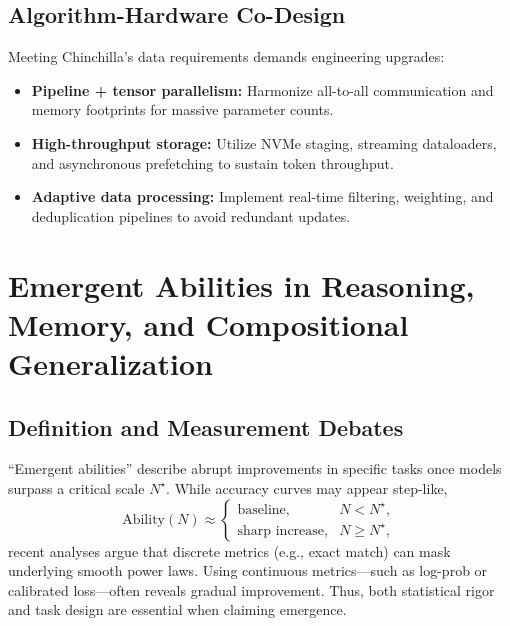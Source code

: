 \documentclass{article}
\begin{document}
\subsection{Algorithm-Hardware Co-Design}
Meeting Chinchilla's data requirements demands engineering upgrades:
\begin{itemize}
  \item \textbf{Pipeline + tensor parallelism:} Harmonize all-to-all communication and memory footprints for massive parameter counts.
  \item \textbf{High-throughput storage:} Utilize NVMe staging, streaming dataloaders, and asynchronous prefetching to sustain token throughput.
  \item \textbf{Adaptive data processing:} Implement real-time filtering, weighting, and deduplication pipelines to avoid redundant updates.
\end{itemize}

\section{Emergent Abilities in Reasoning, Memory, and Compositional Generalization}
\subsection{Definition and Measurement Debates}
``Emergent abilities'' describe abrupt improvements in specific tasks once models surpass a critical scale $N^\star$. While accuracy curves may appear step-like,
\begin{equation}
  \text{Ability}(N) \approx
  \begin{cases}
    \text{baseline}, & N < N^\star,\\
    \text{sharp increase}, & N \ge N^\star,
  \end{cases}
\end{equation}
recent analyses argue that discrete metrics (e.g., exact match) can mask underlying smooth power laws. Using continuous metrics—such as log-prob or calibrated loss—often reveals gradual improvement. Thus, both statistical rigor and task design are essential when claiming emergence.
\end{document}

